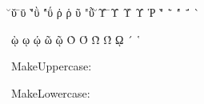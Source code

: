 \documentclass[a4paper]{article}
\begin{document}
{\u\textupsilon                    ῠ
\=\textupsilon                    ῡ
\`"\textupsilon                   ῢ
\'"\textupsilon                   ΰ
\>\textrho                        ῤ
\<\textrho                        ῥ
\accperispomeni\textupsilon       ῦ
\accperispomeni"\textupsilon      ῧ
\u\textUpsilon                    Ῠ
\=\textUpsilon                    Ῡ
\accvaria\textUpsilon             Ὺ
\accoxia\textUpsilon              Ύ
\<\textRho                        Ῥ
\`"{ }                            ῭
\'"{ }                            ΅
\accvaria{ }                      `

\accvaria\textomega\ypogegrammeni ῲ
\textomega\ypogegrammeni          ῳ
\accoxia\textomega\ypogegrammeni  ῴ
\accperispomeni\textomega         ῶ
\accperispomeni\textomega\ypogegrammeni ῷ
\accvaria\textOmicron             Ὸ
\accoxia\textOmicron              Ό
\accvaria\textOmega               Ὼ
\accoxia\textOmega                Ώ
\textOmega\ypogegrammeni          ῼ
\accoxia{ }                       ´
\<{ }                             ῾
}

\greekextended

\noindent MakeUppercase:

\MakeUppercase{\greekextended}

\noindent MakeLowercase:

\MakeLowercase{\greekextended}
\end{document}
